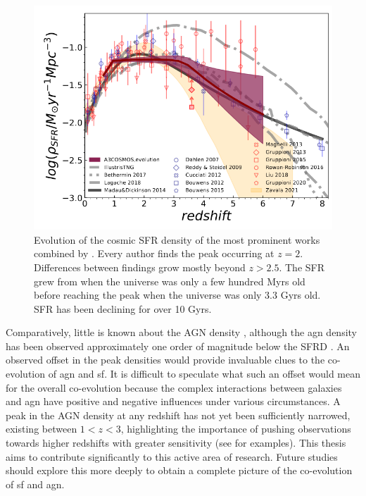 \begin{figure}[ht]
    \centering
    \includegraphics[width=\linewidth]{Figures/traina_LD.png}
    \caption{Evolution of the cosmic SFR density of the most prominent works combined by \cite{traina_a3cosmos_2024}. Every author finds the peak occurring at $z=2$. Differences between findings grow mostly beyond $z>2.5$. The SFR grew from when the universe was only a few hundred Myrs old before reaching the peak when the universe was only 3.3 Gyrs old. SFR has been declining for over 10 Gyrs.}
    \label{Fig: Example Traina Luminosity Density}
\end{figure}

Comparatively, little is known about the AGN density \citep{delvecchio_tracing_2014}, although the \gls{agn} density has been observed approximately one order of magnitude below the SFRD \citep{delvecchio_tracing_2014, symeonidis_agn_2021}. An observed offset in the peak densities would provide invaluable clues to the co-evolution of \gls{agn} and \gls{sf}. It is difficult to speculate what such an offset would mean for the overall co-evolution because the complex interactions between galaxies and \gls{agn} have positive and negative influences under various circumstances. A peak in the AGN density at any redshift has not yet been sufficiently narrowed, existing between $1<z<3$, highlighting the importance of pushing observations towards higher redshifts with greater sensitivity (see \citealp{delvecchio_tracing_2014, symeonidis_agn_2021} for examples). This thesis aims to contribute significantly to this active area of research. Future studies should explore this more deeply to obtain a complete picture of the co-evolution of \gls{sf} and \gls{agn}.

